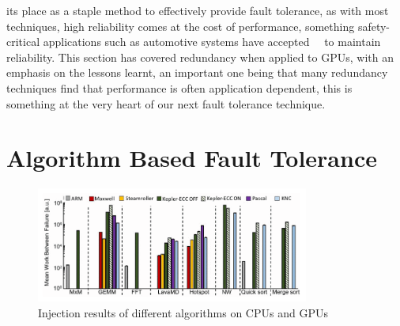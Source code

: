\documentclass{article}
\begin{document}
its place as a staple method to effectively provide fault tolerance, as with most techniques, high reliability comes at the cost of performance, something safety-critical applications such as automotive systems have accepted~\cite{9523531}~\cite{9159153} to maintain reliability. This section has covered redundancy when applied to GPUs, with an emphasis on the lessons learnt, an important one being that many redundancy techniques find that performance is often application dependent, this is something at the very heart of our next fault tolerance technique.

\section{Algorithm Based Fault Tolerance}
\begin{figure}
    \centering
    \includegraphics[width=0.8\textwidth]{pic.png}
    \caption{Injection results of different algorithms on CPUs and GPUs~\cite{8416467}}
    \label{Figure 1:}
\end{figure}
\end{document}
